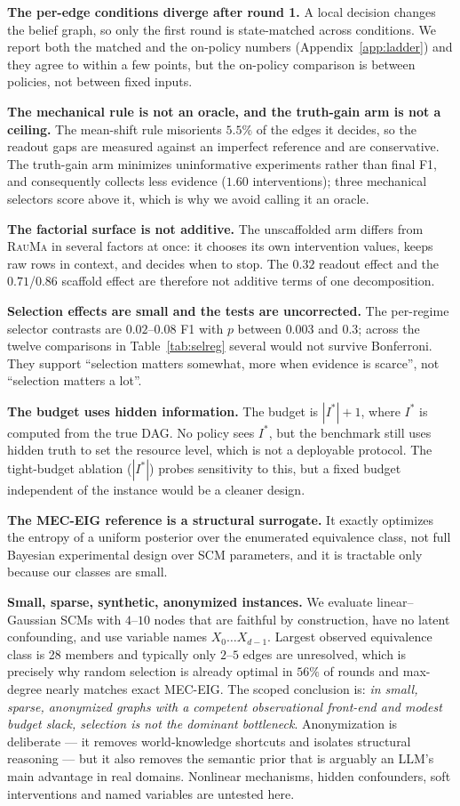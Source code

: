 \documentclass{article}
\newcommand{\rauma}{\textsc{RauMa}}
\begin{document}
\textbf{The per-edge conditions diverge after round 1.} A local decision changes the belief
graph, so only the first round is state-matched across conditions. We report both the matched
and the on-policy numbers (Appendix~\ref{app:ladder}) and they agree to within a few points,
but the on-policy comparison is between policies, not between fixed inputs.

\textbf{The mechanical rule is not an oracle, and the truth-gain arm is not a ceiling.} The
mean-shift rule misorients $5.5\%$ of the edges it decides, so the readout gaps are measured
against an imperfect reference and are conservative. The truth-gain arm minimizes
uninformative experiments rather than final F1, and consequently collects less evidence
($1.60$ interventions); three mechanical selectors score above it, which is why we avoid
calling it an oracle.

\textbf{The factorial surface is not additive.} The unscaffolded arm differs from \rauma{} in
several factors at once: it chooses its own intervention values, keeps raw rows in context,
and decides when to stop. The $0.32$ readout effect and the $0.71$/$0.86$ scaffold effect are
therefore not additive terms of one decomposition.

\textbf{Selection effects are small and the tests are uncorrected.} The per-regime selector
contrasts are $0.02$--$0.08$ F1 with $p$ between $0.003$ and $0.3$; across the twelve
comparisons in Table~\ref{tab:selreg} several would not survive Bonferroni. They support
``selection matters somewhat, more when evidence is scarce'', not ``selection matters a
lot''.

\textbf{The budget uses hidden information.} The budget is $|I^*|+1$, where $I^*$ is computed
from the true DAG. No policy sees $I^*$, but the benchmark still uses hidden truth to set the
resource level, which is not a deployable protocol. The tight-budget ablation
($|I^*|$) probes sensitivity to this, but a fixed budget independent of the instance would be
a cleaner design.

\textbf{The MEC-EIG reference is a structural surrogate.} It exactly optimizes the entropy of
a uniform posterior over the enumerated equivalence class, not full Bayesian experimental
design over SCM parameters, and it is tractable only because our classes are small.

\textbf{Small, sparse, synthetic, anonymized instances.} We evaluate linear--Gaussian SCMs
with $4$--$10$ nodes that are faithful by construction, have no latent confounding, and use
variable names $X_0 \dots X_{d-1}$. Largest observed equivalence class is 28 members and
typically only $2$--$5$ edges are unresolved, which is precisely why random selection is
already optimal in $56\%$ of rounds and max-degree nearly matches exact MEC-EIG. The scoped
conclusion is: \emph{in small, sparse, anonymized graphs with a competent observational
front-end and modest budget slack, selection is not the dominant bottleneck}. Anonymization
is deliberate --- it removes world-knowledge shortcuts and isolates structural reasoning ---
but it also removes the semantic prior that is arguably an LLM's main advantage in real
domains. Nonlinear mechanisms, hidden confounders, soft interventions and named variables are
untested here.
\end{document}
